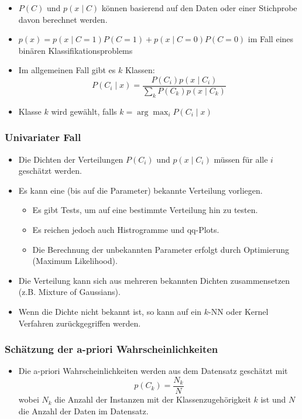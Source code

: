 \documentclass{scrartcl}
\begin{document}
\begin{itemize}
	\item $ P(C) $ und $ p(x \mid C) $ können basierend auf den Daten oder 
	einer Stichprobe davon berechnet werden.
	\item $ p(x) = p(x \mid C=1) P(C=1) + p(x \mid C=0) P(C=0) $ im Fall eines 
	binären Klassifikationsproblems
	\item Im allgemeinen Fall gibt es $ k $ Klassen:
	\[ P(C_i \mid x) = \frac{P(C_i) p(x \mid C_i)}{\sum_k P(C_k) p(x \mid C_k)} 
	\]
	\item Klasse $ k $ wird gewählt, falls $ k = \arg \max_i P(C_i \mid x) $
\end{itemize}

\subsubsection{Univariater Fall}

\begin{itemize}
	\item Die Dichten der Verteilungen $ P(C_i) $ und $ p(x \mid C_i) $ müssen 
	für alle $ i $ geschätzt werden.
	\item Es kann eine (bis auf die Parameter) bekannte Verteilung vorliegen.
	\begin{itemize}
		\item Es gibt Tests, um auf eine bestimmte Verteilung hin zu testen.
		\item Es reichen jedoch auch Histrogramme und qq-Plots.
		\item Die Berechnung der unbekannten Parameter erfolgt durch 
		Optimierung (Maximum Likelihood).
	\end{itemize}
	\item Die Verteilung kann sich aus mehreren bekannten Dichten 
	zusammensetzen (z.B. Mixture of Gaussians).
	\item Wenn die Dichte nicht bekannt ist, so kann auf ein $ k $-NN oder 
	Kernel Verfahren zurückgegriffen werden.
\end{itemize}

\subsubsection{Schätzung der a-priori Wahrscheinlichkeiten}

\begin{itemize}
	\item Die a-priori Wahrscheinlichkeiten werden aus dem Datensatz geschätzt 
	mit
	\[ p(C_k) = \frac{N_k}{N} \]
	wobei $ N_k $ die Anzahl der Instanzen mit der Klassenzugehörigkeit $ k $ 
	ist und $ N $ die Anzahl der Daten im Datensatz.
\end{itemize}
\end{document}
